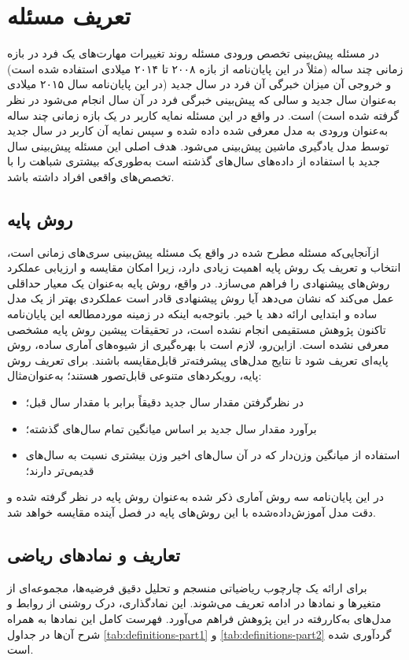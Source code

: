 \section{تعریف مسئله}

در مسئله پیش‌بینی تخصص ورودی مسئله روند تغییرات مهارت‌های یک فرد در بازه زمانی چند ساله (مثلاً در این پایان‌نامه از بازه ۲۰۰۸ تا ۲۰۱۴ میلادی استفاده شده است) و خروجی آن میزان خبرگی آن فرد در سال جدید (در این پایان‌نامه سال ۲۰۱۵ میلادی به‌عنوان سال جدید و سالی که پیش‌بینی خبرگی فرد در آن سال انجام می‌شود در نظر گرفته شده است) است. در واقع در این مسئله نمایه کاربر در یک بازه زمانی چند ساله به‌عنوان ورودی به مدل معرفی شده داده شده و سپس نمایه آن کاربر در سال جدید توسط مدل یادگیری ماشین پیش‌بینی می‌شود. هدف اصلی این مسئله پیش‌بینی سال جدید با استفاده از داده‌های سال‌های گذشته است به‌طوری‌که بیشتری شباهت را با تخصص‌های واقعی افراد داشته باشد.

\subsection{روش پایه }

ازآنجایی‌که مسئله مطرح شده در واقع یک مسئله پیش‌بینی سری‌های زمانی است، انتخاب و تعریف یک روش پایه اهمیت زیادی دارد، زیرا امکان مقایسه و ارزیابی عملکرد روش‌های پیشنهادی را فراهم می‌سازد. در واقع، روش پایه به‌عنوان یک معیار حداقلی عمل می‌کند که نشان می‌دهد آیا روش پیشنهادی قادر است عملکردی بهتر از یک مدل ساده و ابتدایی ارائه دهد یا خیر.
باتوجه‌به اینکه در زمینه موردمطالعه این پایان‌نامه تاکنون پژوهش مستقیمی انجام نشده است، در تحقیقات پیشین روش پایه مشخصی معرفی نشده است. ازاین‌رو، لازم است با بهره‌گیری از شیوه‌های آماری ساده، روش پایه‌ای تعریف شود تا نتایج مدل‌های پیشرفته‌تر قابل‌مقایسه باشند.
برای تعریف روش پایه، رویکردهای متنوعی قابل‌تصور هستند؛ به‌عنوان‌مثال: 

\begin{itemize}
    \item در نظرگرفتن مقدار سال جدید دقیقاً برابر با مقدار سال قبل؛
    \item برآورد مقدار سال جدید بر اساس میانگین تمام سال‌های گذشته؛
    \item استفاده از میانگین وزن‌دار که در آن سال‌های اخیر وزن بیشتری نسبت به سال‌های قدیمی‌تر دارند؛
\end{itemize}

در این پایان‌نامه سه روش آماری ذکر شده به‌عنوان روش پایه در نظر گرفته شده و دقت مدل آموزش‌داده‌شده با این روش‌های پایه در فصل آینده مقایسه خواهد شد.

\subsection{تعاریف و نمادهای ریاضی}
برای ارائه یک چارچوب ریاضیاتی منسجم و تحلیل دقیق فرضیه‌ها، مجموعه‌ای از متغیرها و نمادها در ادامه تعریف می‌شوند. این نمادگذاری، درک روشنی از روابط و مدل‌های به‌کاررفته در این پژوهش فراهم می‌آورد. فهرست کامل این نمادها به همراه شرح آن‌ها در جداول \ref{tab:definitions-part1} و \ref{tab:definitions-part2} گردآوری شده است.

